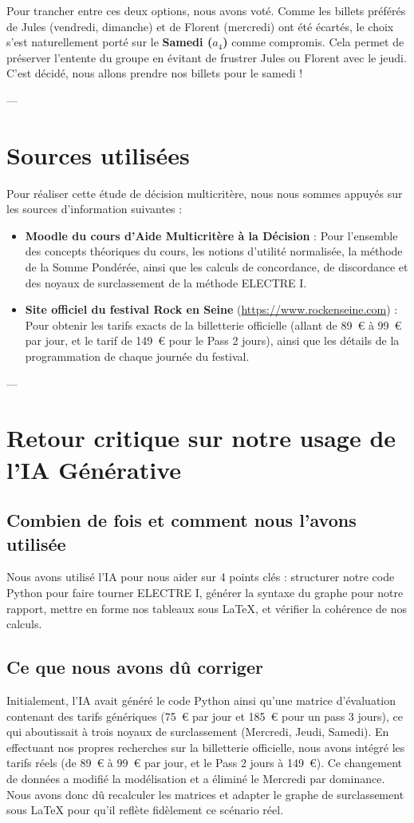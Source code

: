 \documentclass[11pt,a4paper]{article}
\begin{document}
Pour trancher entre ces deux options, nous avons voté. Comme les billets préférés de Jules (vendredi, dimanche) et de Florent (mercredi) ont été écartés, le choix s'est naturellement porté sur le \textbf{Samedi ($a_4$)} comme compromis. Cela permet de préserver l'entente du groupe en évitant de frustrer Jules ou Florent avec le jeudi. C'est décidé, nous allons prendre nos billets pour le samedi !

---

\section{Sources utilisées}
\label{sec:sources}
Pour réaliser cette étude de décision multicritère, nous nous sommes appuyés sur les sources d'information suivantes :
\begin{itemize}
    \item \textbf{Moodle du cours d'Aide Multicritère à la Décision} : Pour l'ensemble des concepts théoriques du cours, les notions d'utilité normalisée, la méthode de la Somme Pondérée, ainsi que les calculs de concordance, de discordance et des noyaux de surclassement de la méthode ELECTRE I.
    \item \textbf{Site officiel du festival Rock en Seine} (\url{https://www.rockenseine.com}) : Pour obtenir les tarifs exacts de la billetterie officielle (allant de 89~€ à 99~€ par jour, et le tarif de 149~€ pour le Pass 2 jours), ainsi que les détails de la programmation de chaque journée du festival.
\end{itemize}

---

\section{Retour critique sur notre usage de l'IA Générative}
\label{sec:evaluation_ia}

\subsection{Combien de fois et comment nous l'avons utilisée}
Nous avons utilisé l'IA pour nous aider sur 4 points clés : structurer notre code Python pour faire tourner ELECTRE I, générer la syntaxe du graphe pour notre rapport, mettre en forme nos tableaux sous LaTeX, et vérifier la cohérence de nos calculs.

\subsection{Ce que nous avons dû corriger}
Initialement, l'IA avait généré le code Python ainsi qu'une matrice d'évaluation contenant des tarifs génériques (75~€ par jour et 185~€ pour un pass 3 jours), ce qui aboutissait à trois noyaux de surclassement (Mercredi, Jeudi, Samedi). En effectuant nos propres recherches sur la billetterie officielle, nous avons intégré les tarifs réels (de 89~€ à 99~€ par jour, et le Pass 2 jours à 149~€). Ce changement de données a modifié la modélisation et a éliminé le Mercredi par dominance. Nous avons donc dû recalculer les matrices et adapter le graphe de surclassement sous LaTeX pour qu'il reflète fidèlement ce scénario réel.
\end{document}
